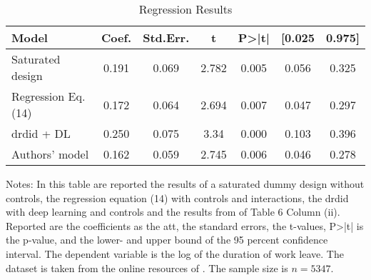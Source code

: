 \begin{table}[ht]
\centering
\begin{threeparttable}
\caption{Regression Results}
\label{tab:reg_results}
\begin{tabular}{lcccccc}
\toprule
\hline
\addlinespace
Model & Coef. & Std.Err. & t & P>|t| & [0.025 & 0.975] \\
\midrule
Saturated design & 0.191 & 0.069 & 2.782 & 0.005 & 0.056 & 0.325 \\
Regression Eq. (14)  & 0.172 & 0.064 & 2.694 & 0.007 & 0.047 & 0.297 \\
\ac{drdid} + DL & 0.250 & 0.075 & 3.34 & 0.000 & 0.103 & 0.396\\
Authors' model & 0.162 & 0.059 &  2.745 & 0.006 & 0.046 & 0.278 \\
\bottomrule
\end{tabular}
\begin{tablenotes}
    \item Notes: In this table are reported the results of a saturated dummy design without controls, the regression equation (14) with controls and interactions, the \ac{drdid} with deep learning and controls and the results from \citet{meyer1990workers} of Table 6 Column (ii). Reported are the coefficients as the \ac{att}, the standard errors, the t-values, P>|t| is the p-value, and the lower- and upper bound of the 95 percent confidence interval. The dependent variable is the log of the duration of work leave. The dataset is taken from the online resources of \citet{wooldridge2019introductory}. The sample size is $n = 5347$.
\end{tablenotes}
\end{threeparttable}
\end{table}
